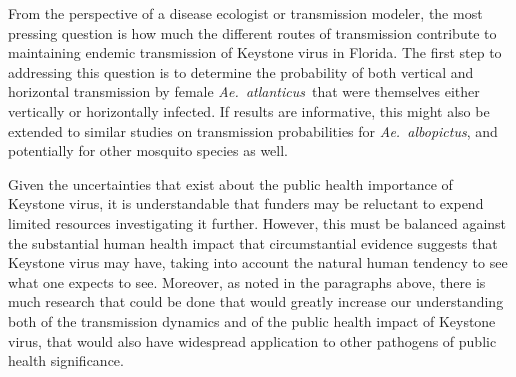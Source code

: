 \documentclass[12pt]{article}
\newcommand{\alb}{\textit{Ae.\ albopictus}}
\newcommand{\atl}{\textit{Ae.\ atlanticus}}
\begin{document}
        From the perspective of a disease ecologist or transmission modeler, the most pressing question is how much the different routes of transmission contribute to maintaining endemic transmission of Keystone virus in Florida. The first step to addressing this question is to determine the probability of both vertical and horizontal transmission by female \atl\ that were themselves either vertically or horizontally infected. If results are informative, this might also be extended to similar studies on transmission probabilities for \alb, and potentially for other mosquito species as well.

        Given the uncertainties that exist about the public health importance of Keystone virus, it is understandable that funders may be reluctant to expend limited resources investigating it further. However, this must be balanced against the substantial human health impact that circumstantial evidence suggests that Keystone virus may have, taking into account the natural human tendency to see what one expects to see. Moreover, as noted in the paragraphs above, there is much research that could be done that would greatly increase our understanding both of the transmission dynamics and of the public health impact of Keystone virus, that would also have widespread application to other pathogens of public health significance.

    \printbibliography{}
\end{document}
